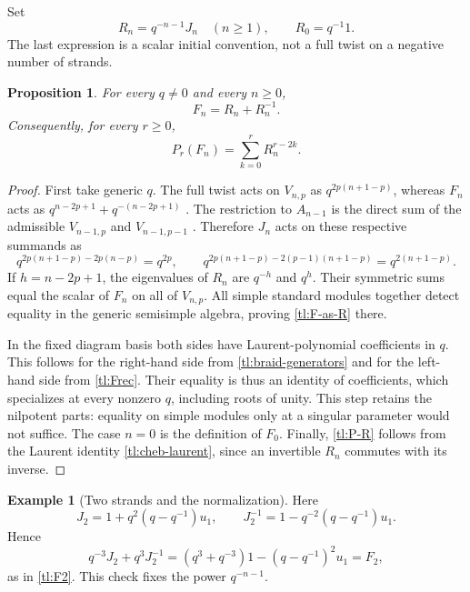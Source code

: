 \documentclass[a4paper,11pt,oneside,reqno]{amsart}
\newtheorem{proposition}[theorem]{Proposition}
\theoremstyle{definition}
\newtheorem{example}[theorem]{Example}
\numberwithin{equation}{section}
\begin{document}
	Set
	\begin{equation}\label{tl:Rn}
		R_n=q^{-n-1}J_n\quad(n\ge1),\qquad R_0=q^{-1}1.
	\end{equation}
	The last expression is a scalar initial convention, not a full twist
	on a negative number of strands.
	
	\begin{proposition}\label{tl:F-R}
		For every $q\ne0$ and every $n\ge0$,
		\begin{equation}\label{tl:F-as-R}
			\boxed{F_n=R_n+R_n^{-1}.}
		\end{equation}
		Consequently, for every $r\ge0$,
		\begin{equation}\label{tl:P-R}
			\boxed{P_r(F_n)=\sum_{k=0}^{r}R_n^{r-2k}.}
		\end{equation}
	\end{proposition}
	\begin{proof}
		First take generic $q$.  The full twist acts on $V_{n,p}$ as
		$q^{2p(n+1-p)}$, whereas $F_n$ acts as
		$q^{n-2p+1}+q^{-(n-2p+1)}$ \cite[Appendix~A]{RSA}.
		The restriction to $A_{n-1}$ is the direct sum of the admissible
		$V_{n-1,p}$ and $V_{n-1,p-1}$
		\cite[Proposition~4.1, Corollary~4.2]{RSA}.
		Therefore $J_n$ acts on these respective summands as
		\[
		q^{2p(n+1-p)-2p(n-p)}=q^{2p},\qquad
		q^{2p(n+1-p)-2(p-1)(n+1-p)}=q^{2(n+1-p)}.
		\]
		If $h=n-2p+1$, the eigenvalues of $R_n$ are $q^{-h}$ and $q^h$.
		Their symmetric sums equal the scalar of $F_n$ on all of $V_{n,p}$.
		All simple standard modules together detect equality in the generic
		semisimple algebra, proving \eqref{tl:F-as-R} there.
		
		In the fixed diagram basis both sides have Laurent-polynomial
		coefficients in $q$.  This follows for the right-hand side from
		\eqref{tl:braid-generators} and for the left-hand side from
		\eqref{tl:Frec}.  Their equality is thus an identity of coefficients,
		which specializes at every nonzero $q$, including roots of unity.
		This step retains the nilpotent parts: equality on simple modules
		only at a singular parameter would not suffice.  The case $n=0$
		is the definition of $F_0$.  Finally, \eqref{tl:P-R} follows from
		the Laurent identity \eqref{tl:cheb-laurent}, since an invertible
		$R_n$ commutes with its inverse.
	\end{proof}
	
	\begin{example}[Two strands and the normalization]
		Here
		\[
		J_2=1+q^2(q-q^{-1})u_1,\qquad
		J_2^{-1}=1-q^{-2}(q-q^{-1})u_1.
		\]
		Hence
		\[
		q^{-3}J_2+q^3J_2^{-1}
		=(q^3+q^{-3})1-(q-q^{-1})^2u_1=F_2,
		\]
		as in \eqref{tl:F2}.  This check fixes the power $q^{-n-1}$.
	\end{example}
	
\end{document}
